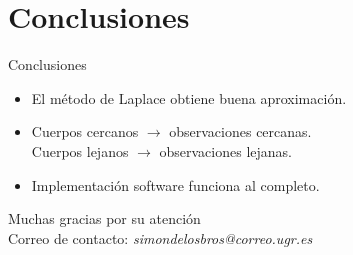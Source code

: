 \documentclass{beamer}
\begin{document}
\section{Conclusiones}

\begin{frame}{Conclusiones}
\begin{itemize}
\item El método de Laplace obtiene buena aproximación.
\item Cuerpos cercanos $\longrightarrow$ observaciones cercanas.\\Cuerpos lejanos $\longrightarrow$ observaciones lejanas.
\item Implementación software funciona al completo.
\end{itemize}
\end{frame}

\begin{frame}

\vspace{1cm}

\begin{center}
\Large Muchas gracias por su atención\\
\vspace{0.7cm}
\footnotesize Correo de contacto: \textit{simondelosbros@correo.ugr.es}
\end{center}

\end{frame}
\end{document}
